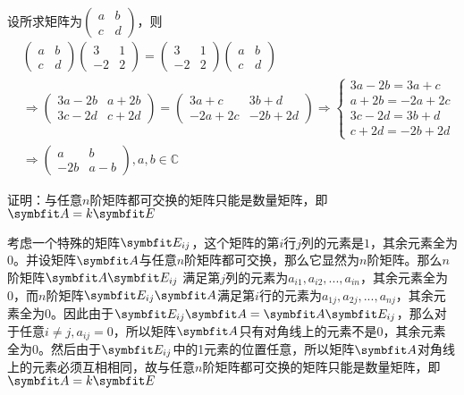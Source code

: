 \begin{solution}
    设所求矩阵为$\begin{pmatrix}a&b\\c&d\end{pmatrix}$，则
    \begin{align*}
    &\begin{pmatrix}a&b\\c&d\end{pmatrix}\begin{pmatrix}3&1\\-2&2\end{pmatrix}=\begin{pmatrix}3&1\\-2&2\end{pmatrix}\begin{pmatrix}a&b\\c&d\end{pmatrix}\\
    &\Rightarrow \begin{pmatrix}3a-2b&a+2b\\3c-2d&c+2d\end{pmatrix}=\begin{pmatrix}3a+c&3b+d\\-2a+2c&-2b+2d\end{pmatrix}\Rightarrow 
    \begin{cases}3a-2b=3a+c\\a+2b=-2a+2c\\3c-2d=3b+d\\c+2d=-2b+2d\end{cases}\\
    &\Rightarrow \begin{pmatrix}a&b\\-2b&a-b\end{pmatrix},a,b\in \mathbb{C}\end{align*}\end{solution}
\begin{example}{}{}
    证明：与任意$n$阶矩阵都可交换的矩阵只能是数量矩阵，即$\bv{A}=k\bv{E}$
\end{example}
\begin{solution}
    考虑一个特殊的矩阵$\bv{E_{ij}}$，这个矩阵的第$i$行$j$列的元素是$1$，其余元素全为$0$。并设矩阵$\bv{A}$与任意$n$阶矩阵都可交换，那么它显然为$n$阶矩阵。那么$n$阶矩阵$\bv{A}\bv{E_{ij}}$ 满足第$j$列的元素为$a_{i1},a_{i2},...,a_{in}$，其余元素全为0，而$n$阶矩阵$\bv{E_{ij}}\bv{A}$满足第$i$行的元素为$a_{1j},a_{2j},...,a_{nj}$，其余元素全为0。因此由于$\bv{E_{ij}}\bv{A}=\bv{A}\bv{E_{ij}}$，那么对于任意$i\ne j,a_{ij}=0$，所以矩阵$\bv{A}$只有对角线上的元素不是0，其余元素全为0。然后由于$\bv{E_{ij}}$中的1元素的位置任意，所以矩阵$\bv{A}$对角线上的元素必须互相相同，故与任意$n$阶矩阵都可交换的矩阵只能是数量矩阵，即$\bv{A}=k\bv{E}$
\end{solution}
